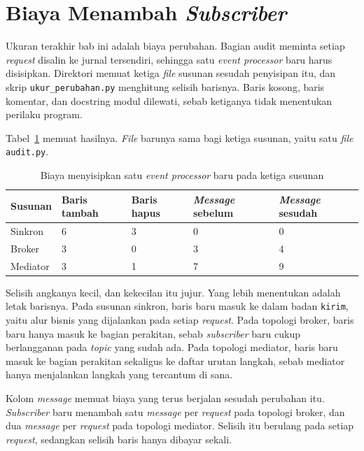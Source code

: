 \section{Biaya Menambah \textit{Subscriber}}

Ukuran terakhir bab ini adalah biaya perubahan. Bagian audit meminta setiap
\textit{request} disalin ke jurnal tersendiri, sehingga satu \textit{event processor} baru harus
disisipkan. Direktori  memuat ketiga
\textit{file} susunan sesudah penyisipan itu, dan skrip \texttt{ukur\_perubahan.py}
menghitung selisih barisnya. Baris kosong, baris komentar, dan docstring modul
dilewati, sebab ketiganya tidak menentukan perilaku program.

Tabel~\ref{tab:perubahan} memuat hasilnya. \textit{File} barunya sama bagi ketiga
susunan, yaitu satu \textit{file} \texttt{audit.py}.

\begin{table}[htbp]
  \centering
  \caption{Biaya menyisipkan satu \textit{event processor} baru pada ketiga susunan}
  \label{tab:perubahan}
  \begin{tabularx}{\textwidth}{|l|l|l|l|X|}
    \hline
    \textbf{Susunan} & \textbf{Baris tambah} & \textbf{Baris hapus} & \textbf{\textit{Message} sebelum} & \textbf{\textit{Message} sesudah} \\
    \hline
    Sinkron & 6 & 3 & 0 & 0 \\
    \hline
    Broker & 3 & 0 & 3 & 4 \\
    \hline
    Mediator & 3 & 1 & 7 & 9 \\
    \hline
  \end{tabularx}
\end{table}

Selisih angkanya kecil, dan kekecilan itu jujur. Yang lebih menentukan adalah
letak barisnya. Pada susunan sinkron, baris baru masuk ke dalam badan
\texttt{kirim}, yaitu alur bisnis yang dijalankan pada setiap \textit{request}. Pada
topologi broker, baris baru hanya masuk ke bagian perakitan, sebab \textit{subscriber}
baru cukup berlangganan pada \textit{topic} yang sudah ada. Pada topologi mediator,
baris baru masuk ke bagian perakitan sekaligus ke daftar urutan langkah, sebab
mediator hanya menjalankan langkah yang tercantum di sana.

Kolom \textit{message} memuat biaya yang terus berjalan sesudah perubahan itu. \textit{Subscriber}
baru menambah satu \textit{message} per \textit{request} pada topologi broker, dan dua \textit{message} per
\textit{request} pada topologi mediator. Selisih itu berulang pada setiap \textit{request},
sedangkan selisih baris hanya dibayar sekali.

